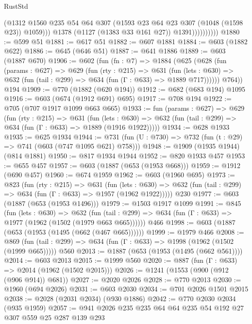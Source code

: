 \begin{lexlean}{RustStd}
\begin{coremodule}
                          (@1312
                            @1560
                            @235
                            @54
                            @64
                            @307
                            (@1593 @23 @64 @23 @307 (@1048 (@1598 @23)) @1059)))
                        @1378
                        (@1127 (@1383 @33 @161 @27))
                        @1391))))))))))
@1880 := @599 @51
@1881 := @617 @51
@1882 := @607 @1881
@1884 := @603 (@1882 @622)
@1886 := @645 (@646 @51)
@1887 := @641 @1886
@1889 := @603 (@1887 @670)
@1906 := @602
    (fun (fn : @7) =>
    @1884
      (@625
        (@628
          (fun (params : @627) =>
          @629
            (fun (rty : @215) =>
            @631
              (fun (lets : @630) =>
              @632 (fun (tail : @299) => @634 (fun (Γ : @633) => @1889 @717))))))
        @764))
    @194
@1909 := @770 (@1882 (@620 @194))
@1912 := @682 (@683 @194) @1095
@1916 := @603 (@674 (@1912 @691) @695)
@1917 := @708 @194
@1922 := @705 (@707 @1917 @1099 @663 @665)
@1933 := fun (params : @627) =>
  @629
    (fun (rty : @215) =>
    @631
      (fun (lets : @630) =>
      @632 (fun (tail : @299) => @634 (fun (Γ : @633) => @1889 (@1916 @1922)))))
@1934 := @628 @1933
@1935 := @625 @1934
@1944 := @731 (fun (U : @730) => @732 (fun (t : @29) => @741 (@603 (@747 @1095 @621) @758)))
@1948 := @1909 (@1935 @1944) (@814 @1881)
@1950 := @817 @1934 @1944
@1952 := @820 @1933 @457
@1953 := @655 @457
@1957 := @603 (@1887 (@653 (@1953 @668)))
@1959 := @1912 (@690 @457)
@1960 := @674 @1959
@1962 := @603 (@1960 @695)
@1973 := @823
    (fun (rty : @215) =>
    @631
      (fun (lets : @630) =>
      @632 (fun (tail : @299) => @634 (fun (Γ : @633) => @1957 (@1962 @1922)))))
    @230
@1977 := @603 (@1887 (@653 (@1953 @1496)))
@1979 := @1503 @1917 @1099
@1991 := @845
    (fun (lets : @630) =>
    @632 (fun (tail : @299) => @634 (fun (Γ : @633) => @1977 (@1962 (@1502 (@1979 @663 @665))))))
    @466
@1998 := @603 (@1887 (@653 (@1953 (@1495 (@662 (@467 @665))))))
@1999 := @1979 @466
@2008 := @869
    (fun (tail : @299) => @634 (fun (Γ : @633) => @1998 (@1962 (@1502 (@1999 @665)))))
    @560
@2013 := @1887 (@653 (@1953 (@1495 (@662 @561))))
@2014 := @603 @2013
@2015 := @1999 @560
@2020 := @887 (fun (Γ : @633) => @2014 (@1962 (@1502 @2015)))
@2026 := @1241 (@1553 (@900 (@912 (@906 @914)) @681))
@2027 := @2020 @2026
@2028 := @770 @2013
@2030 := @1960 (@694 @2026)
@2031 := @603 @2030
@2034 := @701 @2026 @1501 @2015
@2038 := @2028 (@2031 @2034) (@930 @1886)
@2042 := @770 @2030 @2034 (@935 @1959)
@2057 := @941 @2026 @235 @235 @64 @64 @235 @54 @192 @27 @307 @559 @25 @287 @139 @293

\end{coremodule}
\end{lexlean}

